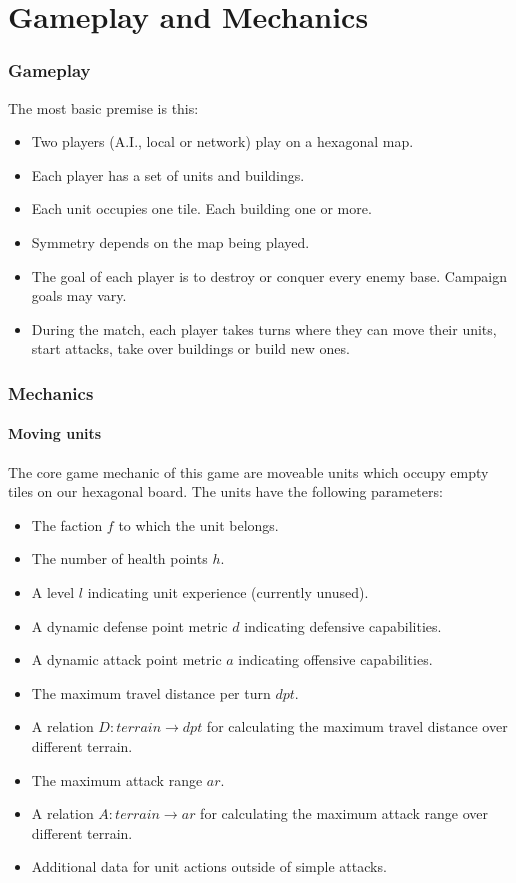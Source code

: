 \part{Gameplay and Mechanics}
\section{Gameplay}
The most basic premise is this:

\begin{itemize}
\item Two players (A.I., local or network) play on a hexagonal map.
\item Each player has a set of units and buildings.
\item Each unit occupies one tile. Each building one or more.
\item Symmetry depends on the map being played.
\item The goal of each player is to destroy or conquer every enemy base. Campaign goals may vary.
\item During the match, each player takes turns where they can move their units, start attacks, take over buildings or build new ones.
\end{itemize}
\section{Mechanics}
\subsection{Moving units} %
The core game mechanic of this game are moveable units which occupy empty tiles on our hexagonal board.
The units have the following parameters:

\begin{itemize}
    \item The faction $f$ to which the unit belongs.
    \item The number of health points $h$.
    \item A level $l$ indicating unit experience (currently unused).
    \item A dynamic defense point metric $d$ indicating defensive capabilities.
    \item A dynamic attack point metric $a$ indicating offensive capabilities.
    \item The maximum travel distance per turn $dpt$.
    \item A relation $D: terrain \to dpt$ for calculating the maximum travel distance over different terrain.
    \item The maximum attack range $ar$.
    \item A relation $A: terrain \to ar$ for calculating the maximum attack range over different terrain.
    \item Additional data for unit actions outside of simple attacks.
\end{itemize}
